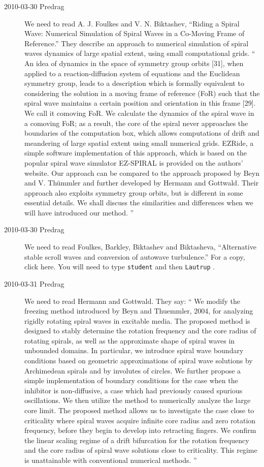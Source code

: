 \begin{description}
\item[2010-03-30 Predrag]
We need to read
A. J. Foulkes and V. N. Biktashev,
``Riding a Spiral Wave: Numerical Simulation of Spiral Waves
in a Co-Moving Frame of Reference.''
They describe an approach to numerical simulation of spiral
waves dynamics of large spatial extent, using small
computational grids.
``
An idea of dynamics in the space of symmetry group
orbits [31], when applied to a reaction-diffusion system
of equations and the Euclidean symmetry group, leads to
a description which is formally equivalent to considering
the solution in a moving frame of reference (FoR) such
that the spiral wave maintains a certain position and orientation
in this frame [29]. We call it comoving FoR.
We calculate
the dynamics of the spiral wave in a comoving FoR;
as a result, the core of the spiral never approaches the
boundaries of the computation box, which allows computations
of drift and meandering of large spatial extent using
small numerical grids. EZRide, a simple software implementation
of this approach, which is based on the popular spiral
wave simulator EZ-SPIRAL is provided on the authors' website.
Our approach can be compared to the approach proposed
by Beyn and V. Th\"ummler and further developed
by Hermann and Gottwald. Their approach also exploits
symmetry group orbits, but is different in some
essential details. We shall discuss the similarities and
differences when we will have introduced our method.
''

\item[2010-03-30 Predrag]
We need to read
Foulkes, Barkley, Biktashev and Biktasheva,
``Alternative stable scroll waves and conversion of autowave turbulence.''
For a copy, 
{click here}. You will need to type \texttt{student} and then \texttt{Lautrup} .


\item[2010-03-31 Predrag]
We need to read
    {Hermann and Gottwald}. They say:
``
We modify the freezing method introduced by Beyn and
Thuemmler, 2004, for analyzing rigidly rotating spiral waves
in excitable media. The proposed method is designed to stably
determine the rotation frequency and the core radius of
rotating spirals, as well as the approximate shape of spiral
waves in unbounded domains. In particular, we introduce
spiral wave boundary conditions based on geometric
approximations of spiral wave solutions by Archimedean
spirals and by involutes of circles. We further propose a
simple implementation of boundary conditions for the case
when the inhibitor is non-diffusive, a case which had
previously caused spurious oscillations.
We then utilize the method to numerically analyze the large
core limit. The proposed method allows us to investigate the
case close to criticality where spiral waves acquire infinite
core radius and zero rotation frequency, before they begin to
develop into retracting fingers. We confirm the linear
scaling regime of a drift bifurcation for the rotation
frequency and the core radius of spiral wave solutions close
to criticality. This regime is unattainable with conventional
numerical methods.
''



\end{description}
